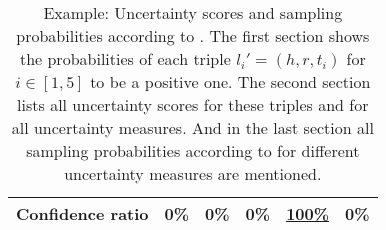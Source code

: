 \begin{table}[h]
\begin{tabular}{llllll}
        Confidence ratio
        & 0\% 
        & 0\% 
        & 0\% 
        & \underline{100\%}
        & 0\% \\
        
        \bottomrule
    \end{tabular}
    \caption{Example: Uncertainty scores and sampling probabilities according to \usmax. 
    The first section shows the probabilities of each triple $l_i' = (h, r, t_i)$ for $i \in [1,5]$ to be a positive one. 
    The second section lists all uncertainty scores for these triples and for all uncertainty measures.
    And in the last section all sampling probabilities according to \usmax for different uncertainty measures are mentioned.}
\label{tab:uncertainty_measure_example_max}
\end{table}